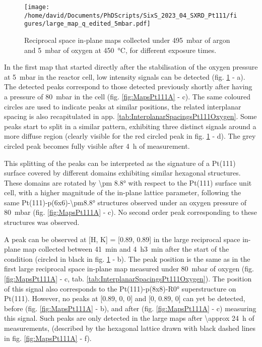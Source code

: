 \begin{figure}[!htb]
    \centering
    \texttt{[image: /home/david/Documents/PhDScripts/SixS\_2023\_04\_SXRD\_Pt111/figures/large\_map\_q\_edited\_5mbar.pdf]}
    \caption{
        Reciprocal space in-plane maps collected under \qty{495}{\milli\bar} of argon and \qty{5}{\milli\bar} of oxygen at \qty{450}{\degreeCelsius}, for different exposure times.
    }
    \label{fig:LargeMapsPt111LowOxygen}
\end{figure}

In the first map that started directly after the stabilisation of the oxygen pressure at \qty{5}{\milli\bar} in the reactor cell, low intensity signals can be detected (fig. \ref{fig:LargeMapsPt111LowOxygen} - a).
The detected peaks correspond to those detected previously shortly after having a pressure of \qty{80}{\milli\bar} in the cell (fig. \ref{fig:MapsPt111A} - c).
The same coloured circles are used to indicate peaks at similar positions, the related interplanar spacing is also recapitulated in app. \ref{tab:InterplanarSpacingsPt111Oxygen}.
Some peaks start to split in a similar pattern, exhibiting three distinct signals around a more diffuse region (clearly visible for the red circled peak in fig. \ref{fig:LargeMapsPt111LowOxygen} - d).
The grey circled peak becomes fully visible after \qty{4}{\hour} of measurement.

This splitting of the peaks can be interpreted as the signature of a Pt(111) surface covered by different domains exhibiting similar hexagonal structures.
These domains are rotated by \ang{\pm 8.8} with respect to the Pt(111) surface unit cell, with a higher magnitude of the in-plane lattice parameter, following the same Pt(111)-p(6x6)-\ang{\pm8.8} structures observed under an oxygen pressure of \qty{80}{\milli\bar} (fig. \ref{fig:MapsPt111A} - c).
No second order peak corresponding to these structures was observed.

A peak can be observed at [H, K] = [0.89, 0.89] in the large reciprocal space in-plane map collected between \qty{41}{\minute} and \qty{4}{\hour}\qty{3}{\minute} after the start of the condition (circled in black in fig. \ref{fig:LargeMapsPt111LowOxygen} - b).
The peak position is the same as in the first large reciprocal space in-plane map measured under \qty{80}{\milli\bar} of oxygen (fig. \ref{fig:MapsPt111A} - c, tab. \ref{tab:InterplanarSpacingsPt111Oxygen}).
The position of this signal also corresponds to the Pt(111)-p(8x8)-R\ang{0} superstructure on Pt(111).
However, no peaks at [0.89, 0, 0] and [0, 0.89, 0] can yet be detected, before (fig. \ref{fig:MapsPt111A} - b), and after (fig. \ref{fig:MapsPt111A} - c) measuring this signal.
Such peaks are only detected in the large maps after \qty{\approx 24}{\hour} of measurements, (described by the hexagonal lattice drawn with black dashed lines in fig. \ref{fig:MapsPt111A} - f).

